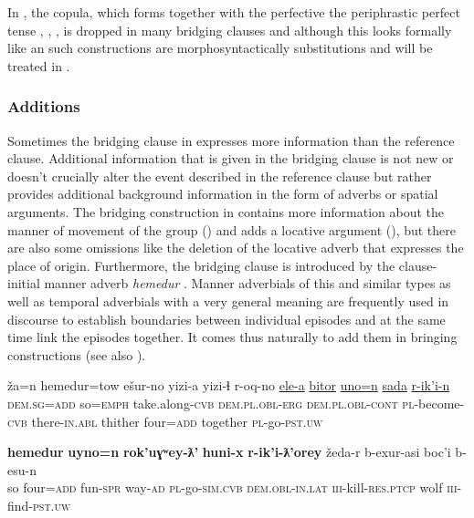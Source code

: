 \documentclass[output=paper]{LSP/langsci}
\begin{document}
In , the copula, which forms together with the perfective  the periphrastic perfect tense , , , is dropped in many bridging clauses and although this looks formally like an  such constructions are morphosyntactically substitutions and will be treated in .  

\subsubsection{Additions}
\label{ssec:Additions}
Sometimes the bridging clause in  expresses more information than the reference clause. Additional information that is given in the bridging clause is not new or doesn't crucially alter the event described in the reference clause but rather provides additional background information in the form of adverbs or spatial arguments. 
The bridging construction in  contains more information about the manner of movement of the group () and adds a locative argument (), but there are also some omissions like the deletion of the locative adverb that expresses the place of origin. Furthermore, the bridging clause is introduced by the clause-initial manner adverb \textit{hemedur} . Manner adverbials of this and similar types as well as temporal adverbials with a very general meaning are frequently used in  discourse to establish boundaries between individual episodes and at the same time link the episodes together. It comes thus naturally to add them in bringing constructions (see also ).


\begin{exe}
	\ex	\label{ex:11ab}
	\begin{xlist}
		\ex	\label{ex:11a}
		\gll	ža=n   			hemedur=tow  	ešur-no       			yizi-a yizi-ɬ       				r-oq-no       			\underline{ele-a\smash{y}}     		\underline{bitor}  \underline{uno=n}   	\underline{sada}    			\underline{r-ik’i-n} \\
			\textsc{dem.sg=add} 	so=\textsc{emph} 		take.along-\textsc{cvb} 	\textsc{dem.pl.obl-erg}  \textsc{dem.pl.obl-cont} 	\textsc{pl}-become-\textsc{cvb} 	there-\textsc{in.abl} 	thither four=\textsc{add} 	together 			\textsc{pl}-go-\textsc{pst.uw}\\
		\glt	{}

		\ex	\label{ex:11b}
		\gll		\textbf{hemedur}   \textbf{uyno=n}   	\textbf{rok’uɣʷey-ƛ’}    	\textbf{huni-x}      	\textbf{r-ik’i-ƛ’orey}  žeda-r     			b-exur-asi     	boc’i 		b-esu-n \\
			so        		four=\textsc{add} 	fun-\textsc{spr} 			way-\textsc{ad} \textsc{pl}-go-\textsc{sim.cvb} \textsc{dem.obl-in.lat} 		\textsc{iii}-kill-\textsc{res.ptcp} 	wolf    	\textsc{iii}-find-\textsc{pst.uw}  \\
		\glt	{} 
	\end{xlist}
\end{exe}
\end{document}
